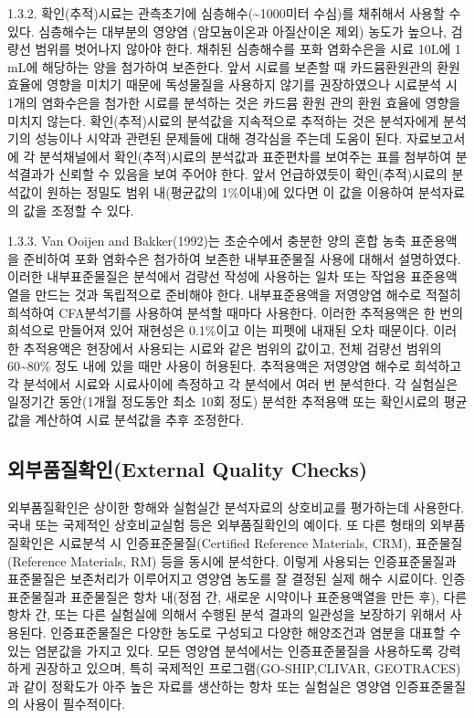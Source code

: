 \documentclass[
]{book}
\begin{document}
1.3.2. 확인(추적)시료는 관측초기에 심층해수(\textasciitilde1000미터 수심)를 채취해서 사용할 수 있다. 심층해수는 대부분의 영양염 (암모늄이온과 아질산이온 제외) 농도가 높으나, 검량선 범위를 벗어나지 않아야 한다. 채취된 심층해수를 포화 염화수은을 시료 10L에 1 mL에 해당하는 양을 첨가하여 보존한다. 앞서 시료를 보존할 때 카드뮴환원관의 환원효율에 영향을 미치기 때문에 독성물질을 사용하지 않기를 권장하였으나 시료분석 시 1개의 염화수은을 첨가한 시료를 분석하는 것은 카드뮴 환원 관의 환원 효율에 영향을 미치지 않는다. 확인(추적)시료의 분석값을 지속적으로 추적하는 것은 분석자에게 분석기의 성능이나 시약과 관련된 문제들에 대해 경각심을 주는데 도움이 된다. 자료보고서에 각 분석채널에서 확인(추적)시료의 분석값과 표준편차를 보여주는 표를 첨부하여 분석결과가 신뢰할 수 있음을 보여 주어야 한다. 앞서 언급하였듯이 확인(추적)시료의 분석값이 원하는 정밀도 범위 내(평균값의 1\%이내)에 있다면 이 값을 이용하여 분석자료의 값을 조정할 수 있다.

1.3.3. Van Ooijen and Bakker(1992)는 초순수에서 충분한 양의 혼합 농축 표준용액을 준비하여 포화 염화수은 첨가하여 보존한 내부표준물질 사용에 대해서 설명하였다. 이러한 내부표준물질은 분석에서 검량선 작성에 사용하는 일차 또는 작업용 표준용액열을 만드는 것과 독립적으로 준비해야 한다. 내부표준용액을 저영양염 해수로 적절히 희석하여 CFA분석기를 사용하여 분석할 때마다 사용한다. 이러한 추적용액은 한 번의 희석으로 만들어져 있어 재현성은 0.1\%이고 이는 피펫에 내재된 오차 때문이다. 이러한 추적용액은 현장에서 사용되는 시료와 같은 범위의 값이고, 전체 검량선 범위의 60\textasciitilde80\% 정도 내에 있을 때만 사용이 허용된다. 추적용액은 저영양염 해수로 희석하고 각 분석에서 시료와 시료사이에 측정하고 각 분석에서 여러 번 분석한다. 각 실험실은 일정기간 동안(1개월 정도동안 최소 10회 정도) 분석한 추적용액 또는 확인시료의 평균값을 계산하여 시료 분석값을 추후 조정한다.

\hypertarget{uxc678uxbd80uxd488uxc9c8uxd655uxc778external-quality-checks}{%
\subsection{외부품질확인(External Quality Checks)}\label{uxc678uxbd80uxd488uxc9c8uxd655uxc778external-quality-checks}}

외부품질확인은 상이한 항해와 실험실간 분석자료의 상호비교를 평가하는데 사용한다. 국내 또는 국제적인 상호비교실험 등은 외부품질확인의 예이다. 또 다른 형태의 외부품질확인은 시료분석 시 인증표준물질(Certified Reference Materials, CRM), 표준물질 (Reference Materials, RM) 등을 동시에 분석한다. 이렇게 사용되는 인증표준물질과 표준물질은 보존처리가 이루어지고 영양염 농도를 잘 결정된 실제 해수 시료이다. 인증표준물질과 표준물질은 항차 내(정점 간, 새로운 시약이나 표준용액열을 만든 후), 다른 항차 간, 또는 다른 실험실에 의해서 수행된 분석 결과의 일관성을 보장하기 위해서 사용된다. 인증표준물질은 다양한 농도로 구성되고 다양한 해양조건과 염분을 대표할 수 있는 염분값을 가지고 있다. 모든 영양염 분석에서는 인증표준물질을 사용하도록 강력하게 권장하고 있으며, 특히 국제적인 프로그램(GO-SHIP,CLIVAR, GEOTRACES)과 같이 정확도가 아주 높은 자료를 생산하는 항차 또는 실험실은 영양염 인증표준물질의 사용이 필수적이다.
\end{document}

